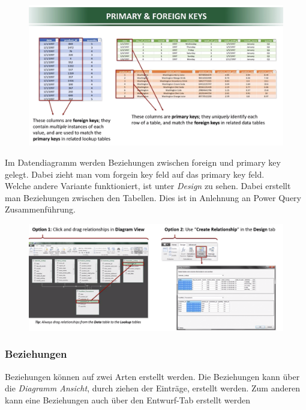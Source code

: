 \begin{figure}[H]
	\centering
	\includegraphics[scale = 0.3]{attachment/chapter_1/screenshot047}
	\caption{}
	\label{fig:screenshot047}
\end{figure}


Im Datendiagramm werden Beziehungen zwischen foreign und primary key gelegt. Dabei zieht man vom forgein key feld auf das primary key feld.\\ 

Welche andere Variante funktioniert, ist unter \textit{Design} zu sehen. Dabei erstellt man Beziehungen zwischen den Tabellen. Dies ist in Anlehnung an Power Query Zusammenführung.
\begin{figure}[H]
	\centering
	\includegraphics[scale = 0.3]{attachment/chapter_1/screenshot045}
	\caption{}
	\label{fig:screenshot045}
\end{figure}
\subsubsection{Beziehungen}
Beziehungen können auf zwei Arten erstellt werden. Die Beziehungen kann über die \textit{Diagramm Ansicht}, durch ziehen der Einträge, erstellt werden. Zum anderen kann eine Beziehungen auch über den Entwurf-Tab erstellt werden

